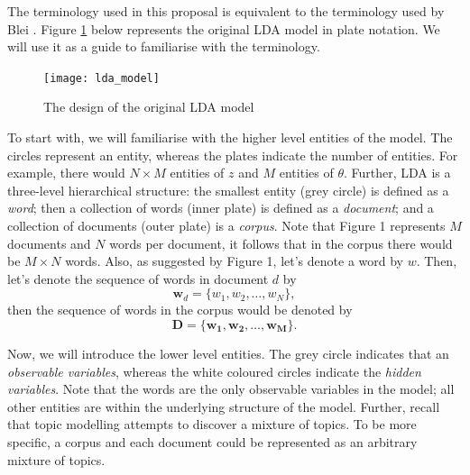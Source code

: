 \documentclass{mprop}
\begin{document}
\par The terminology used in this proposal is equivalent to the terminology used by Blei \cite{blei_2012}. Figure \ref{fig:lda} below represents the original LDA model in plate notation. We will use it as a guide to familiarise with the terminology.   
\begin{figure}[H]
  \centering
  \texttt{[image: lda\_model]}
  \caption{The design of the original LDA model}
  \label{fig:lda}
\end{figure}

\par To start with, we will familiarise with the higher level entities of the model. The circles represent an entity, whereas the plates indicate the number of entities. For example, there would $N \times M$ entities of $z$ and $M$ entities of $\theta$. Further, LDA is a three-level hierarchical structure: the smallest entity (grey circle) is defined as a \textit{word}; then a collection of words (inner plate) is defined as a \textit{document}; and a collection of documents (outer plate) is a \textit{corpus}. Note that Figure 1 represents $M$ documents and $N$ words per document, it follows that in the corpus there would be $M \times N$ words. Also, as suggested by Figure 1, let's denote a word by $w$. Then, let's denote the sequence of words in document $d$ by 
\begin{equation*}
\mathbf{w}_d = \{w_1, w_2, \dots, w_N\},
\end{equation*}
then the sequence of words in the corpus would be denoted by
\begin{equation*}
\mathcal{\mathbf{D}} = \{\mathbf{w_1}, \mathbf{w_2}, \dots, \mathbf{w_M}\}.
\end{equation*}
 
\par Now, we will introduce the lower level entities. The grey circle indicates that an \textit{observable variables}, whereas the white coloured circles indicate the \textit{hidden variables}. Note that the words are the only observable variables in the model; all other entities are within the underlying structure of the model. Further, recall that topic modelling attempts to discover a mixture of topics. To be more specific, a corpus and each document could be represented as an arbitrary mixture of topics. 
\end{document}
